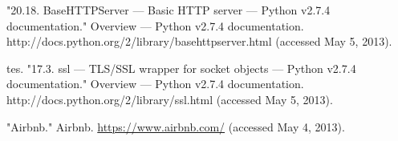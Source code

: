 \documentclass[10pt]{article}
\begin{document}
\begin{multicols}{2}
\begin{thebibliography}{99}
"20.18. BaseHTTPServer --- Basic HTTP server --- Python v2.7.4 documentation." Overview --- Python v2.7.4 documentation. http://docs.python.org/2/library/basehttpserver.html (accessed May 5, 2013).

tes. "17.3. ssl --- TLS/SSL wrapper for socket objects --- Python v2.7.4 documentation." Overview --- Python v2.7.4 documentation. http://docs.python.org/2/library/ssl.html (accessed May 5, 2013).

"Airbnb." Airbnb. \url{https://www.airbnb.com/} (accessed May 4, 2013).
\end{thebibliography}


\end{multicols}
\end{document}

